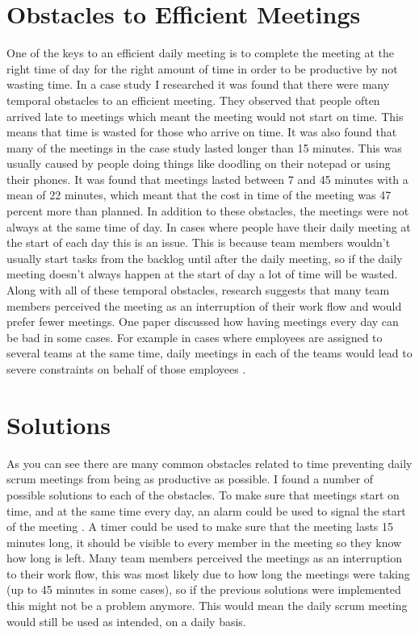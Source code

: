 \documentclass{scrartcl}
\begin{document}
\section{Obstacles to Efficient Meetings}

One of the keys to an efficient daily meeting is to complete the meeting at the right time of day for the right amount of time in order to be productive by not wasting time. In a case study I researched \cite{Obstacles} it was found that there were many temporal obstacles to an efficient meeting. They observed that people often arrived late to meetings which meant the meeting would not start on time. This means that time is wasted for those who arrive on time. It was also found that many of the meetings in the case study lasted longer than 15 minutes. This was usually caused by people doing things like doodling on their notepad or using their phones. It was found that meetings lasted between 7 and 45 minutes with a mean of 22 minutes, which meant that the cost in time of the meeting was 47 percent more than planned. In addition to these obstacles, the meetings were not always at the same time of day. In cases where people have their daily meeting at the start of each day this is an issue. This is because team members wouldn't usually start tasks from the backlog until after the daily meeting, so if the daily meeting doesn't always happen at the start of day a lot of time will be wasted. Along with all of these temporal obstacles, research suggests that many team members perceived the meeting as an interruption of their work flow and would prefer fewer meetings. One paper discussed how having meetings every day can be bad in some cases. For example in cases where employees are assigned to several teams at the same time, daily meetings in each of the teams would lead to severe constraints on behalf of those employees \cite{ScrumEveryDay}.

\section{Solutions}

As you can see there are many common obstacles related to time preventing daily scrum meetings from being as productive as possible. I found a number of possible solutions to each of the obstacles. To make sure that meetings start on time, and at the same time every day, an alarm could be used to signal the start of the meeting \cite{Obstacles}.  A timer could be used to make sure that the meeting lasts 15 minutes long, it should be visible to every member in the meeting so they know how long is left. Many team members perceived the meetings as an interruption to their work flow, this was most likely due to how long the meetings were taking (up to 45 minutes in some cases), so if the previous solutions were implemented this might not be a problem anymore. This would mean the daily scrum meeting would still be used as intended, on a daily basis.    
\end{document}
